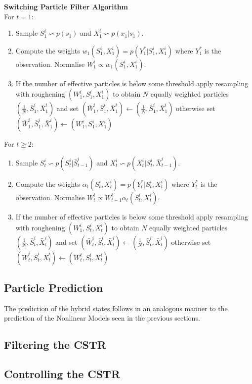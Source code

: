 \documentclass[../masters.tex]{subfiles}
\begin{document}
\textbf{Switching Particle Filter Algorithm}\\
For $t=1$:
\begin{enumerate}
\item
Sample $S^i_1 \backsim p(s_1)$ and $X^i_1 \backsim p(x_1|s_1)$.
\item
Compute the weights $w_1(S_1^i, X_1^i) = p(Y^*_1|S_1^i, X_1^i)$ where $Y^*_1$ is the observation. Normalise $W^i_1 \propto w_1(S_1^i, X_1^i)$. 
\item
If the number of effective particles is below some threshold apply resampling with roughening $(W^i_1, S^i_1, X^i_1)$ to obtain $N$ equally weighted particles $(\frac{1}{N}, \bar{S}^i_1, \bar{X}^i_1)$ and set $(\bar{W}^i_1, \bar{S}^i_1,\bar{X}^i_1) \leftarrow (\frac{1}{N}, \bar{S}^i_1, \bar{X}^i_1)$ otherwise set $(\bar{W}^i_1,\bar{S}^i_1, \bar{X}^i_1) \leftarrow ({W}^i_1, S_1^i, {X}^i_1)$
\end{enumerate}
For $t \geq 2$:
\begin{enumerate}
\item
Sample $S^i_t \backsim p(S_t^i|\bar{S}^i_{t-1})$ and $X^i_t \backsim p(X^i_t|S^i_t, \bar{X}^i_{t-1})$.
\item
Compute the weights $\alpha_t(S_t^i, X_t^i) = p(Y^*_t|S_t^i, X_t^i)$ where $Y^*_t$ is the observation. Normalise $W^i_t \propto W^i_{t-1}\alpha_t(S_t^i, X_t^i)$.
\item
If the number of effective particles is below some threshold apply resampling with roughening $(W^i_1, S^i_t, X^i_t)$ to obtain $N$ equally weighted particles $(\frac{1}{N}, \bar{S}^i_t, \bar{X}^i_t)$ and set $(\bar{W}^i_t, \bar{S}^i_t,\bar{X}^i_t) \leftarrow (\frac{1}{N}, \bar{S}^i_t, \bar{X}^i_t)$ otherwise set $(\bar{W}^i_t,\bar{S}^i_t, \bar{X}^i_t) \leftarrow ({W}^i_t, S_t^i, {X}^i_t)$
\end{enumerate} 

\subsection{Particle Prediction}
The prediction of the hybrid states follows in an analogous manner to the prediction of the Nonlinear Models seen in the previous sections.  

\subsection{Filtering the CSTR}

\subsection{Controlling the CSTR}



\end{document}
